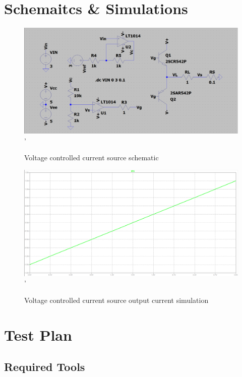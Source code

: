\documentclass[10pt,twocolumn,letterpaper]{article}
\begin{document}
\newpage
\section{Schemaitcs \& Simulations} \label{app:schematics}

\begin{figure}[htb]
  \centering
  \includegraphics[width=\linewidth, keepaspectratio]{figures/current-source-schematic.png}'
  \caption{Voltage controlled current source schematic}
  \label{fig:schm-current-source}
\end{figure}

\begin{figure}[htb]
  \centering
  \includegraphics[width=\linewidth, keepaspectratio]{figures/current-source-output.png}'
  \caption{Voltage controlled current source output current simulation}
  \label{fig:sim-current-source-output-current}
\end{figure}


\section{Test Plan}

\subsection{Required Tools}
\end{document}
